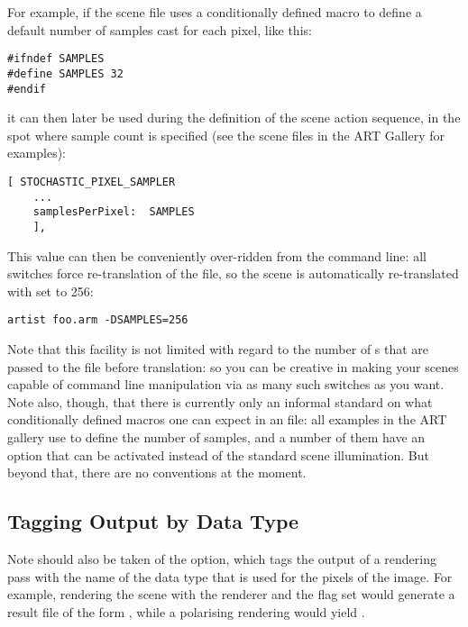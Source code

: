 For example, if the scene file  uses a conditionally defined macro  to define a default number of samples cast for each pixel, like this:

\begin{verbatim}
#ifndef SAMPLES
#define SAMPLES 32
#endif
\end{verbatim}

it can then later be used during the definition of the scene action sequence, in the spot where sample count is specified (see the scene files in the ART Gallery for examples):

\begin{verbatim}
[ STOCHASTIC_PIXEL_SAMPLER
	...
    samplesPerPixel:  SAMPLES
    ],
\end{verbatim}

This value can then be conveniently over-ridden from the command line: all  switches force re-translation of the  file, so the scene is automatically re-translated with  set to 256:

\begin{verbatim}
artist foo.arm -DSAMPLES=256
\end{verbatim}

Note that this facility is not limited with regard to the number of s that are passed to the  file before translation: so you can be creative in making your scenes capable of command line manipulation via as many such switches as you want. Note also, though, that there is currently only an informal standard on what conditionally defined macros one can expect in an  file: all examples in the ART gallery use  to define the number of samples, and a number of them have an option  that can be activated instead of the standard scene illumination. But beyond that, there are no conventions at the moment.

\subsection{Tagging Output by Data Type}
Note should also be taken of the  option, which tags the output of a
rendering pass with the name of the data type that is used for the pixels of the image. For example,
rendering the scene  with the  renderer and
the  flag set would generate a result file of the form
, while a polarising  rendering would yield
.

